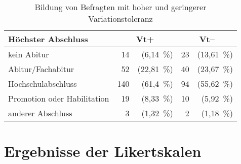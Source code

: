 \begin{table}
\centering
\begin{tabular}{lrrrr}
\textbf{Höchster Abschluss}                   & \multicolumn{2}{c}{\textbf{Vt+}} & \multicolumn{2}{c}{\textbf{Vt--}} \\ \hline
kein Abitur                 & 14             & (6,14~\%)            & 23             & (13,61~\%)            \\ %
Abitur/Fachabitur           & 52             & (22,81~\%)           & 40             & (23,67~\%)            \\ %
Hochschulabschluss          & 140            & (61,4~\%)            & 94             & (55,62~\%)            \\ %
Promotion oder Habilitation & 19             & (8,33~\%)            & 10             & (5,92~\%)             \\ %
anderer Abschluss           & 3              & (1,32~\%)            & 2              & (1,18~\%)             \\ 
\end{tabular}
\caption{Bildung von Befragten mit hoher und geringerer Variationstoleranz}
\label{table:AnhBildungundVt}
\end{table}
\newpage \section*{Ergebnisse der Likertskalen}
